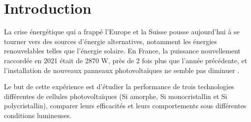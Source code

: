 \section{Introduction}

La crise énergétique qui a frappé l'Europe et la Suisse pousse aujourd'hui à se tourner vers des sources d'énergie alternatives, notamment les énergies renouvelables telles que l'énergie solaire.
En France, la puissance nouvellement raccordée en 2021 était de 2870 \unit{\watt}, près de 2 fois plus que l'année précédente, et l'installation de nouveaux panneaux photovoltaïques ne semble pas diminuer \cite{installationsolaire}.

Le but de cette expérience est d'étudier la performance de trois technologies différentes de cellules photovoltaïques (Si amorphe, Si monocristallin et Si polycristallin), comparer leurs efficacités et leurs comportements sous différentes conditions lumineuses.
